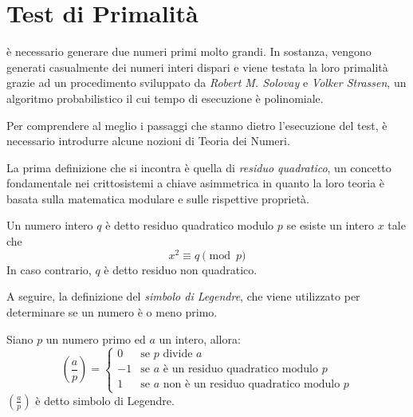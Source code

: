 
\chapter{Test di Primalità}

 è necessario generare due numeri primi molto grandi. In sostanza, vengono generati casualmente dei numeri interi dispari e viene testata la loro primalità grazie ad un procedimento sviluppato da \emph{Robert M. Solovay} e \emph{Volker Strassen}, un algoritmo probabilistico il cui tempo di esecuzione è polinomiale.

Per comprendere al meglio i passaggi che stanno dietro l'esecuzione del test, è necessario introdurre alcune nozioni di Teoria dei Numeri.

La prima definizione che si incontra è quella di \emph{residuo quadratico}, un concetto fondamentale nei crittosistemi a chiave asimmetrica in quanto la loro teoria è basata sulla matematica modulare e sulle rispettive proprietà.

\begin{definizione}
	Un numero intero $q$ è detto residuo quadratico modulo $p$ se esiste un intero $x$ tale che 
	\begin{equation*}
		x^2 \equiv q \pmod{p}
	\end{equation*}
	In caso contrario, $q$ è detto residuo non quadratico.
\end{definizione}

A seguire, la definizione del \emph{simbolo di Legendre}, che viene utilizzato per determinare se un numero è o meno primo.

\begin{definizione}
	Siano $p$ un numero primo ed $a$ un intero, allora:
	\begin{equation*}
		\left( \frac{a}{p} \right) =
		\begin{cases}
			0 &\text{se } p \text{ divide } a \\
			-1 &\text{se } a \text{ è un residuo quadratico modulo } p\\
			1 &\text{se } a \text{ non è un residuo quadratico modulo } p
		\end{cases}
	\end{equation*}
	$\left( \frac{a}{p} \right)$ è detto simbolo di Legendre.
\end{definizione}

